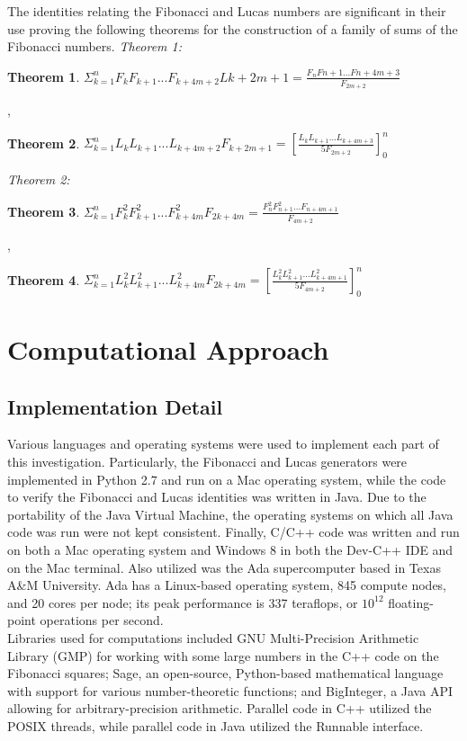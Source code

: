 \documentclass[11pt]{article}
\newtheorem{theorem}{Theorem}[section]
\begin{document}
The identities relating the Fibonacci and Lucas numbers are significant in their use proving the following theorems for the construction of a family of sums of the Fibonacci numbers.
\textit{Theorem 1:}  

\begin{theorem}
$\Sigma_{k=1}^{n} F_{k}F_{k+1}...F_{k+4m+2}L{k+2m+1} = \frac{F_{n}F{n+1}...F{n+4m+3}}{F_{2m+2}}$
\end{theorem},

\begin{theorem}
$\Sigma_{k=1}^{n} L_{k}L_{k+1}...L_{k+4m+2}F_{k+2m+1}=[\frac{L_{k}L_{k+1}...L_{k+4m+3}}{5F_{2m+2}}]_{0}^n$
\end{theorem}

\textit{Theorem 2:}

\begin{theorem}
$\Sigma_{k=1}^n F_{k}^2F_{k+1}^2...F_{k+4m}^2F_{2k+4m}=\frac{F_{n}^2F_{n+1}^2...F_{n+4m+1}}{F_{4m+2}}$
\end{theorem},

\begin{theorem}
$\Sigma_{k=1}^n L_{k}^2L_{k+1}^2...L_{k+4m}^2F_{2k+4m}=[\frac{L_{k}^2L_{k+1}^2...L_{k+4m+1}^2}{5F_{4m+2}}]_{0}^n$
\end{theorem}



\section{Computational Approach}
\subsection{Implementation Detail}
Various languages and operating systems were used to implement each part of this investigation. Particularly, the Fibonacci and Lucas generators were implemented in Python 2.7 and run on a Mac operating system, while the code to verify the Fibonacci and Lucas identities was written in Java. Due to the portability of the Java Virtual Machine, the operating systems on which all Java code was run were not kept consistent. Finally, C/C++ code was written and run on both a Mac operating system and Windows 8 in both the Dev-C++ IDE and on the Mac terminal. Also utilized was the Ada supercomputer based in Texas A\&M University. Ada has a Linux-based operating system, 845 compute nodes, and 20 cores per node; its peak performance is 337 teraflops, or $10^{12}$ floating-point operations per second. \\
Libraries used for computations included GNU Multi-Precision Arithmetic Library (GMP) for working with some large numbers in the C++ code on the Fibonacci squares; Sage, an open-source, Python-based mathematical language with support for various number-theoretic functions; and BigInteger, a Java API allowing for arbitrary-precision arithmetic. Parallel code in C++ utilized the POSIX threads, while parallel code in Java utilized the Runnable interface.
\end{document}
